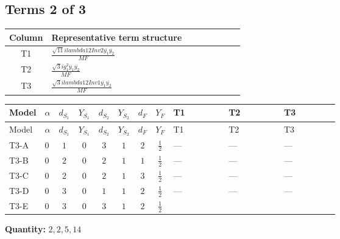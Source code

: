 \documentclass[8pt]{article}
\begin{document}
\begin{landscape}
\subsection*{Terms 2 of 3}
\begin{center}
\begin{tabular}{@{}c >{\raggedright\arraybackslash}p{0.82\linewidth}@{}}
\toprule
Column & Representative term structure \\
\midrule
T1 & \(\displaystyle \frac{\sqrt{11} i lambda12Inv2 \overline{y_{1}} \overline{y_{2}}}{MF}\) \\
\midrule
T2 & \(\displaystyle \frac{\sqrt{3} i g_{1}^{2} \overline{y_{1}} \overline{y_{2}}}{MF}\) \\
\midrule
T3 & \(\displaystyle \frac{\sqrt{3} i lambda12Inv1 \overline{y_{1}} \overline{y_{2}}}{MF}\) \\
\midrule
\bottomrule
\end{tabular}
\end{center}
\smallskip
\tiny
\begin{longtable}{@{}llcccccc >{\raggedright\arraybackslash}p{0.21\linewidth} >{\raggedright\arraybackslash}p{0.21\linewidth} >{\raggedright\arraybackslash}p{0.21\linewidth}@{}}
\toprule
Model & $\alpha$ & $d_{S_1}$ & $Y_{S_1}$ & $d_{S_2}$ & $Y_{S_2}$ & $d_F$ & $Y_F$ & T1 & T2 & T3 \\
\midrule
\endfirsthead
\toprule
Model & $\alpha$ & $d_{S_1}$ & $Y_{S_1}$ & $d_{S_2}$ & $Y_{S_2}$ & $d_F$ & $Y_F$ & T1 & T2 & T3 \\
\midrule
\endhead
T3-A & $0$ & $1$ & $0$ & $3$ & $1$ & $2$ & $\frac{1}{2}$ & --- & --- & --- \\
\midrule
T3-B & $0$ & $2$ & $0$ & $2$ & $1$ & $1$ & $\frac{1}{2}$ & --- & --- & --- \\
\midrule
T3-C & $0$ & $2$ & $0$ & $2$ & $1$ & $3$ & $\frac{1}{2}$ & --- & --- & --- \\
\midrule
T3-D & $0$ & $3$ & $0$ & $1$ & $1$ & $2$ & $\frac{1}{2}$ & --- & --- & --- \\
\midrule
T3-E & $0$ & $3$ & $0$ & $3$ & $1$ & $2$ & $\frac{1}{2}$ & \scriptsize\adjustbox{max width=\linewidth}{$\begin{gathered} - \frac{3 \sqrt{11} i lambda12Inv2 \overline{y_{1}} \overline{y_{2}}}{22 MF}\end{gathered}$} & \scriptsize\adjustbox{max width=\linewidth}{$\begin{gathered} - \frac{\sqrt{3} i g_{1}^{2} \overline{y_{1}} \overline{y_{2}}}{8 MF}\end{gathered}$} & \scriptsize\adjustbox{max width=\linewidth}{$\begin{gathered} \frac{\sqrt{3} i lambda12Inv1 \overline{y_{1}} \overline{y_{2}}}{6 MF}\end{gathered}$} \\
\midrule
\bottomrule
\end{longtable}
\clearpage
\noindent\textbf{Quantity: }$\mathrm{2,2,5,14}$\par\smallskip

\end{landscape}
\end{document}
